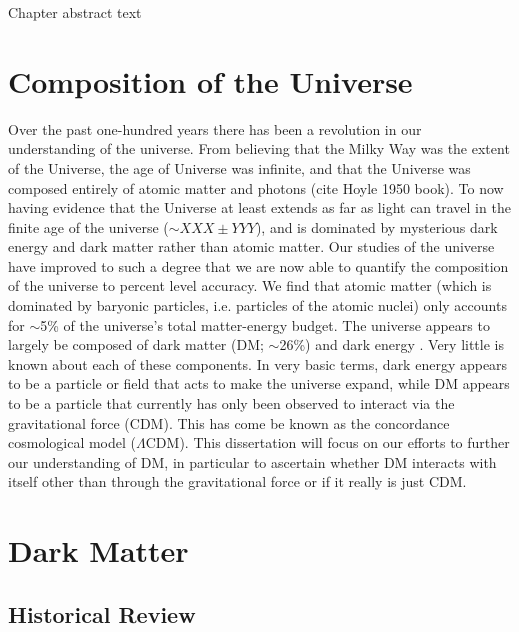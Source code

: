 \label{chapter:1}

Chapter abstract text

\section{Composition of the Universe}\label{section:CompositionOfTheUniverse}

Over the past one-hundred years there has been a revolution in our understanding of the universe.
From believing that the Milky Way was the extent of the Universe, the age of Universe was infinite, and that the Universe was composed entirely of atomic matter and photons (cite Hoyle 1950 book).
To now having evidence that the Universe at least extends as far as light can travel in the finite age of the universe ($\sim XXX \pm YYY$), and is dominated by mysterious dark energy and dark matter rather than atomic matter.
Our studies of the universe have improved to such a degree that we are now able to quantify the composition of the universe to percent level accuracy. 
We find that atomic matter (which is dominated by baryonic particles, i.e. particles of the atomic nuclei) only accounts for $\sim$5\% of the universe's total matter-energy budget.
The universe appears to largely be composed of dark matter (DM; $\sim$26\%) and dark energy \citep[$\sim$69\%; see][for more accurate values]{Collaboration:2013uv}.
Very little is known about each of these components.
In very basic terms, dark energy appears to be a particle or field that acts to make the universe expand, while DM appears to be a particle that currently has only been observed to interact via the gravitational force (CDM).
This has come be known as the concordance cosmological model ($\Lambda$CDM).
This dissertation will focus on our efforts to further our understanding of DM, in particular to ascertain whether DM interacts with itself other than through the gravitational force or if it really is just CDM.

\section{Dark Matter}

\subsection{Historical Review}

